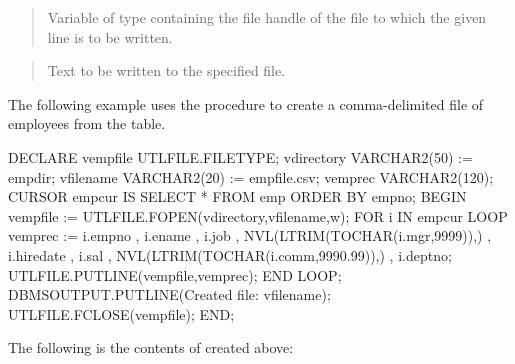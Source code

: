 \documentclass[letterpaper,10pt,english,openany,oneside]{sphinxmanual}
\begin{document}
\begin{quote}

Variable of type  containing the file handle of the file to
which the given line is to be written.
\end{quote}

\begin{quote}

Text to be written to the specified file.
\end{quote}


The following example uses the  procedure to create a
comma-delimited file of employees from the  table.

%
\begin{sphinxVerbatim}[commandchars=\\\{\}]
DECLARE
    v\PYGZus{}empfile       UTL\PYGZus{}FILE.FILE\PYGZus{}TYPE;
    v\PYGZus{}directory     VARCHAR2(50) := \PYGZsq{}empdir\PYGZsq{};
    v\PYGZus{}filename      VARCHAR2(20) := \PYGZsq{}empfile.csv\PYGZsq{};
    v\PYGZus{}emprec        VARCHAR2(120);
    CURSOR emp\PYGZus{}cur IS SELECT * FROM emp ORDER BY empno;
BEGIN
    v\PYGZus{}empfile := UTL\PYGZus{}FILE.FOPEN(v\PYGZus{}directory,v\PYGZus{}filename,\PYGZsq{}w\PYGZsq{});
    FOR i IN emp\PYGZus{}cur LOOP
        v\PYGZus{}emprec := i.empno \textbar{}\textbar{} \PYGZsq{},\PYGZsq{} \textbar{}\textbar{} i.ename \textbar{}\textbar{} \PYGZsq{},\PYGZsq{} \textbar{}\textbar{} i.job \textbar{}\textbar{} \PYGZsq{},\PYGZsq{} \textbar{}\textbar{}
            NVL(LTRIM(TO\PYGZus{}CHAR(i.mgr,\PYGZsq{}9999\PYGZsq{})),\PYGZsq{}\PYGZsq{}) \textbar{}\textbar{} \PYGZsq{},\PYGZsq{} \textbar{}\textbar{} i.hiredate \textbar{}\textbar{}
            \PYGZsq{},\PYGZsq{} \textbar{}\textbar{} i.sal \textbar{}\textbar{} \PYGZsq{},\PYGZsq{} \textbar{}\textbar{}
            NVL(LTRIM(TO\PYGZus{}CHAR(i.comm,\PYGZsq{}9990.99\PYGZsq{})),\PYGZsq{}\PYGZsq{}) \textbar{}\textbar{} \PYGZsq{},\PYGZsq{} \textbar{}\textbar{} i.deptno;
        UTL\PYGZus{}FILE.PUT\PYGZus{}LINE(v\PYGZus{}empfile,v\PYGZus{}emprec);
    END LOOP;
    DBMS\PYGZus{}OUTPUT.PUT\PYGZus{}LINE(\PYGZsq{}Created file: \PYGZsq{} \textbar{}\textbar{} v\PYGZus{}filename);
    UTL\PYGZus{}FILE.FCLOSE(v\PYGZus{}empfile);
END;
\end{sphinxVerbatim}

The following is the contents of  created above:
\end{document}
